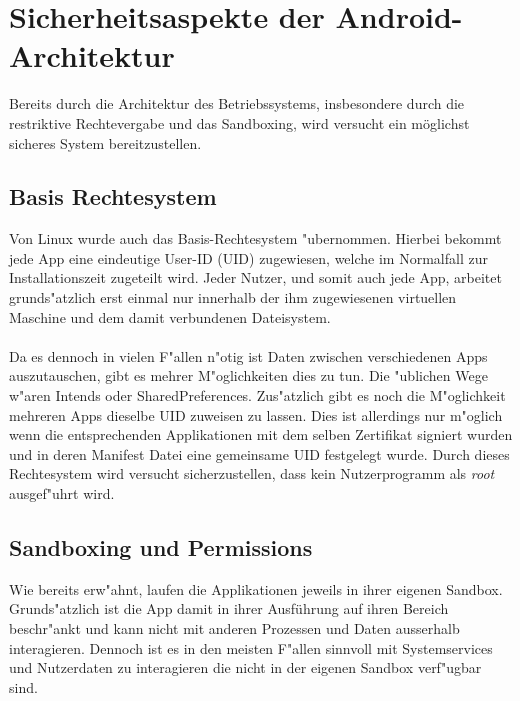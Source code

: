 \section{Sicherheitsaspekte der Android-Architektur}

	Bereits durch die Architektur des Betriebssystems, insbesondere durch die restriktive Rechtevergabe und das Sandboxing, wird versucht ein möglichst sicheres System bereitzustellen.

	\subsection{Basis Rechtesystem}\label{sec:BasisRechteSystem}
	Von Linux wurde auch das Basis-Rechtesystem "ubernommen. Hierbei bekommt jede App eine eindeutige User-ID (UID) zugewiesen, welche im Normalfall zur Installationszeit zugeteilt wird. Jeder Nutzer, und somit auch jede App, arbeitet grunds"atzlich erst einmal nur innerhalb der ihm zugewiesenen virtuellen Maschine und dem damit verbundenen Dateisystem.\\\\
	Da es dennoch in vielen F"allen n"otig ist Daten zwischen verschiedenen Apps auszutauschen, gibt es mehrer M"oglichkeiten dies zu tun. Die "ublichen Wege w"aren Intends oder SharedPreferences. Zus"atzlich gibt es noch die M"oglichkeit mehreren Apps dieselbe UID zuweisen zu lassen. Dies ist allerdings nur m"oglich wenn die entsprechenden Applikationen mit dem selben Zertifikat signiert wurden und in deren Manifest Datei eine gemeinsame UID festgelegt wurde.
	Durch dieses Rechtesystem wird versucht sicherzustellen, dass kein Nutzerprogramm als \textit{root} ausgef"uhrt wird.
	
	\subsection{Sandboxing und Permissions} \label{sec:SandBoxingNPermissions}
	Wie bereits erw"ahnt, laufen die Applikationen jeweils in ihrer eigenen Sandbox. Grunds"atzlich ist die App damit in ihrer Ausführung auf ihren Bereich beschr"ankt und kann nicht mit anderen Prozessen und Daten ausserhalb interagieren. Dennoch ist es in den meisten F"allen sinnvoll mit Systemservices und Nutzerdaten zu interagieren die nicht in der eigenen Sandbox verf"ugbar sind. 
	
